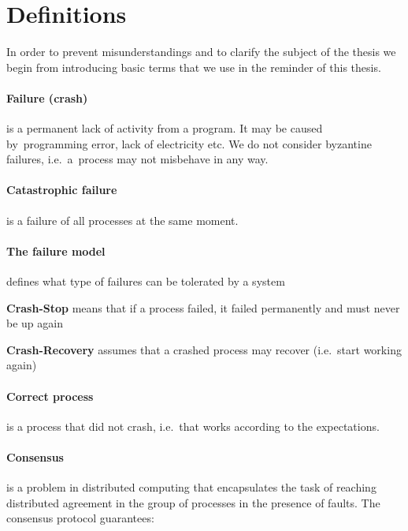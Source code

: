 \clearpage

\section{Definitions}

In order to prevent misunderstandings and to clarify the subject of the thesis we begin from introducing
basic terms that we use in the reminder of this thesis.

\paragraph{Failure (crash)}
is a permanent lack of activity from a program. It may be caused by~programming error, lack of electricity etc.
We do not consider byzantine failures, i.e.~a~process may not misbehave in any way.

\paragraph{Catastrophic failure} is a failure of all processes at the same moment.

\paragraph{The failure model}
defines what type of failures can be tolerated by a system
\begin{tightList}[ \setlength{\leftmargin}{2\leftmargin}]
 \item[\textbf{Crash-Stop}] means that if a process failed, it failed permanently and must never be up again
 \item[\textbf{Crash-Recovery}] assumes that a crashed process may recover (i.e.\ start working again)
\end{tightList}

\paragraph{Correct process} is a process that did not crash, i.e.\ that works according to the expectations.

\paragraph{Consensus}
is a problem in distributed computing that encapsulates the task of reaching distributed agreement in the group of processes in the presence of faults.
The consensus protocol guarantees:

